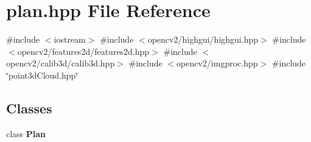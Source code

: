 \section{plan.\+hpp File Reference}
\label{plan_8hpp}
{\ttfamily \#include $<$iostream$>$}\newline
{\ttfamily \#include $<$opencv2/highgui/highgui.\+hpp$>$}\newline
{\ttfamily \#include $<$opencv2/features2d/features2d.\+hpp$>$}\newline
{\ttfamily \#include $<$opencv2/calib3d/calib3d.\+hpp$>$}\newline
{\ttfamily \#include $<$opencv2/imgproc.\+hpp$>$}\newline
{\ttfamily \#include \char`\"{}point3d\+Cloud.\+hpp\char`\"{}}\newline
\subsection*{Classes}
\begin{DoxyCompactItemize}
\item 
class \textbf{ Plan}
\end{DoxyCompactItemize}
